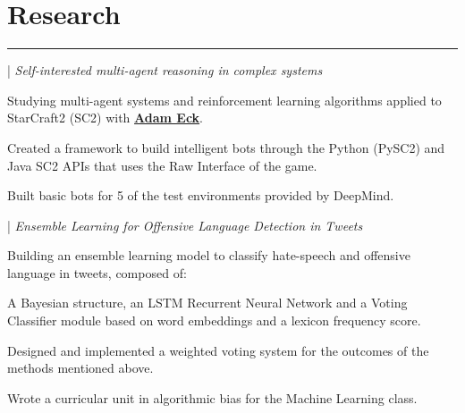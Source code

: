 \documentclass[]{dafirebanks-resume-openfont}
\begin{document}
\begin{minipage}[t]{0.66\textwidth}

\section{Research}
\vspace{-3pt}
{\color{blue}\hrule} \vspace{5pt}
 
 | \textit{Self-interested multi-agent reasoning in complex systems}\\
\begin{tightemize}
	\item Studying multi-agent systems and reinforcement learning algorithms applied to StarCraft2 (SC2) with \textbf{\href{http://www.cs.oberlin.edu/~aeck/}{Adam Eck}}.  
	\item Created a framework to build intelligent bots through the Python (PySC2) and Java SC2 APIs that uses the Raw Interface of the game. 
	\item Built basic bots for 5 of the test environments provided by DeepMind.
\end{tightemize}
\sectionsep

 | \textit{Ensemble Learning for Offensive Language Detection in Tweets}
\begin{tightemize}
	\item Building an ensemble learning model to classify hate-speech and offensive language in tweets, composed of:
	\vspace{\topsep}
	\begin{tightemize}
		\item A Bayesian structure, an LSTM Recurrent Neural Network and a Voting Classifier module based on word embeddings and a lexicon frequency score. 
	\end{tightemize}\vspace{\topsep}
	\item Designed and implemented a weighted voting system for the outcomes of the methods mentioned above.
	\item Wrote a curricular unit in algorithmic bias for the Machine Learning class.
\end{tightemize}
\sectionsep





\end{minipage}
\end{document}
